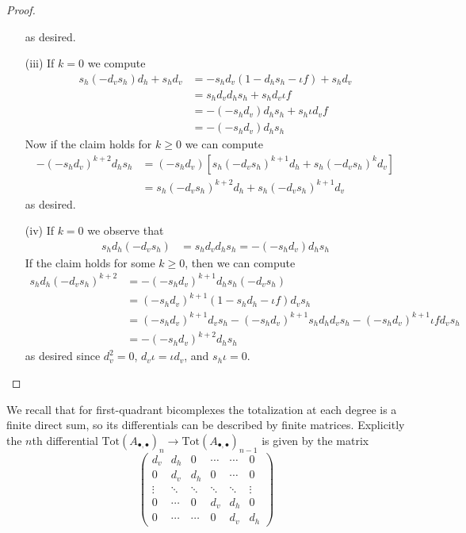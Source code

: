 \begin{proof}
\begin{itemize}
        as desired.
        \item[(iii)] If $k = 0$ we compute
        \begin{align*}
            s_h(-d_vs_h)d_h+s_hd_v &= -s_hd_v(1-d_hs_h-\iota f)+s_hd_v \\
            &= s_hd_vd_hs_h+s_hd_v\iota f \\
            &= -(-s_hd_v)d_hs_h+s_h\iota d_vf \\
            &= -(-s_hd_v)d_hs_h
        \end{align*}
        Now if the claim holds for $k \geq 0$ we can compute
        \begin{align*}
            -(-s_hd_v)^{k+2}d_hs_h &= (-s_hd_v)[s_h(-d_vs_h)^{k+1}d_h+s_h(-d_vs_h)^kd_v] \\
            &= s_h(-d_vs_h)^{k+2}d_h+s_h(-d_vs_h)^{k+1}d_v
        \end{align*}
        as desired.
        \item[(iv)] If $k = 0$ we observe that
        \begin{align*}
            s_hd_h(-d_vs_h) &= s_hd_vd_hs_h = -(-s_hd_v)d_hs_h
        \end{align*}
        If the claim holds for some $k \geq 0$, then we can compute
        \begin{align*}
            s_hd_h(-d_vs_h)^{k+2} &= -(-s_hd_v)^{k+1}d_hs_h(-d_vs_h) \\
            &= (-s_hd_v)^{k+1}(1-s_hd_h-\iota f)d_vs_h \\
            &= (-s_hd_v)^{k+1}d_vs_h-(-s_hd_v)^{k+1}s_hd_hd_vs_h-(-s_hd_v)^{k+1}\iota fd_vs_h \\
            &= -(-s_hd_v)^{k+2}d_hs_h
        \end{align*}
        as desired since $d_v^2 = 0$, $d_v\iota = \iota d_v$, and $s_h\iota = 0$.
    \end{itemize}
\end{proof}

We recall that for first-quadrant bicomplexes the totalization at each degree is a finite direct sum, so its differentials can be described by finite matrices. Explicitly the $n$th differential $\text{Tot}(A_{\bullet,\bullet})_n\to \text{Tot}(A_{\bullet,\bullet})_{n-1}$ is given by the matrix
\begin{equation*}
    \begin{pmatrix}
        d_v & d_h & 0 & \cdots & \cdots & 0 \\
        0 & d_v & d_h & 0 & \cdots & 0 \\
        \vdots & \ddots & \ddots & \ddots & \ddots & \vdots \\
        0 & \cdots & 0 & d_v & d_h & 0 \\
        0 & \cdots & \cdots & 0 & d_v & d_h
    \end{pmatrix}
\end{equation*}


